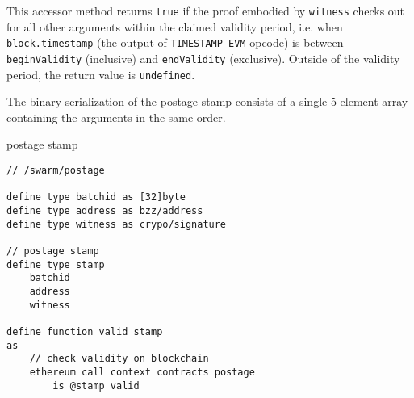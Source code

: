This accessor method returns \lstinline{true} if the proof embodied by \lstinline{witness} checks out for all other arguments within the claimed 
validity period, i.e. when \lstinline{block.timestamp} (the output of \lstinline{TIMESTAMP EVM} opcode) is between \lstinline{beginValidity} (inclusive) and 
\lstinline{endValidity} (exclusive). Outside of the validity period, the return value is \lstinline{undefined}.

The binary serialization of the postage stamp consists of a single 5-element array containing the arguments in the same order. 


\begin{definition}{postage stamp}\label{def:postage-stamp}
\begin{lstlisting}[language=buzz1]
// /swarm/postage

define type batchid as [32]byte  
define type address as bzz/address
define type witness as crypo/signature

// postage stamp
define type stamp  
    batchid
    address
    witness

define function valid stamp
as 
    // check validity on blockchain
    ethereum call context contracts postage
        is @stamp valid
        
\end{lstlisting}
\end{definition}

